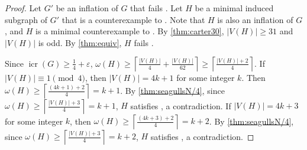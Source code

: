 \documentclass[11pt]{article}
\numberwithin{equation}{section}
\theoremstyle{plain}
\theoremstyle{definition}
\renewcommand{\geq}{\geqslant}
\DeclareMathOperator{\icr}{icr}
\begin{document}
\begin{proof}
    Let $G'$ be an inflation of $G$ that fails . Let $H$ be a minimal induced subgraph of $G'$ that is a counterexample to . Note that $H$ is also an inflation of $G$, and $H$ is a minimal counterexample to .
    By \cref{thm:carter30}, $|V(H)| \geq 31$ and $|V(H)|$ is odd. By  \cref{thm:equiv}, $H$ fails .

    Since $\icr(G) \geq \frac{1}{4}  + \varepsilon$, $
        \omega(H) \geq \left\lceil \frac{|V(H)|}{4} + \frac{|V(H)|}{62}\right \rceil \geq \left\lceil \frac{|V(H)| + 2}{4} \right\rceil$.
    If $|V(H)| \equiv 1 \pmod 4$, then $|V(H)| = 4k + 1$ for some integer $k$. Then $
        \omega(H) \geq \left\lceil \frac{(4k+1)+ 2}{4} \right\rceil = k + 1$.
    By \cref{thm:seagullsN/4}, since $\omega(H) \geq \left\lceil \frac{|V(H)| + 3}{4} \right\rceil = k + 1$, $H$ satisfies , a contradiction.
    If $|V(H)| = 4k + 3$ for some integer $k$, then $
        \omega(H) \geq \left\lceil \frac{(4k + 3) + 2}{4} \right\rceil = k + 2$.
    By \cref{thm:seagullsN/4}, since $\omega(H) \geq \left\lceil \frac{|V(H)| + 3}{4} \right\rceil = k + 2$, $H$ satisfies , a contradiction.
\end{proof}
\end{document}
